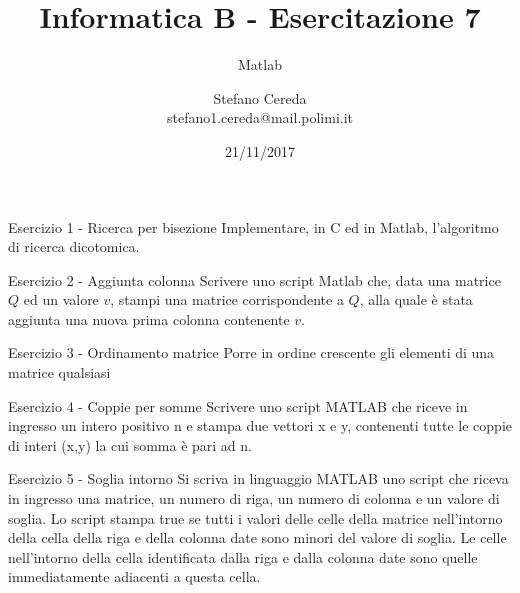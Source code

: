 \documentclass[handout]{beamer}
\title{Informatica B - Esercitazione 7}
\subtitle{Matlab}
\author{Stefano Cereda\\
		stefano1.cereda@mail.polimi.it
	}
\date{21/11/2017}
\institute[PoliMi]{\vspace{0.5cm}\centering Politecnico di Milano \\ \vspace{0.2cm}
	\texttt{[image: ./logopolimi]}}
\begin{document}
\begin{frame}
	\maketitle
\end{frame}

\begin{frame}{Esercizio 1 - Ricerca per bisezione}
Implementare, in C ed in Matlab, l'algoritmo di ricerca dicotomica.
\end{frame}

\begin{frame}{Esercizio 2 - Aggiunta colonna}
Scrivere uno script Matlab che, data una matrice $Q$ ed un valore $v$, stampi una
matrice corrispondente a $Q$, alla quale è stata aggiunta una nuova prima
colonna contenente $v$.
\end{frame}

\begin{frame}{Esercizio 3 - Ordinamento matrice}
Porre in ordine crescente gli elementi di una matrice qualsiasi
\end{frame}

\begin{frame}{Esercizio 4  - Coppie per somme}
Scrivere uno script MATLAB che riceve in ingresso un intero positivo n e stampa due vettori x e y, contenenti tutte le coppie di interi (x,y) la cui somma è pari ad n.
\end{frame}

\begin{frame}{Esercizio 5 - Soglia intorno}
Si scriva in linguaggio MATLAB uno script che riceva in ingresso una matrice, un numero di riga, un numero di colonna e un valore di soglia. Lo script stampa true se tutti i valori delle celle della matrice nell’intorno della cella della riga e della colonna date sono minori del valore di soglia. Le celle nell’intorno della cella identificata dalla riga e dalla colonna date sono quelle immediatamente adiacenti a questa cella.
\end{frame}
\end{document}
